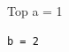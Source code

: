 \documentclass{article}
\begin{document}
\begin{codebox}{Top}
a = 1
\end{codebox}
\begin{lstlisting}[title={Own title}]
b = 2
\end{lstlisting}
\end{document}

